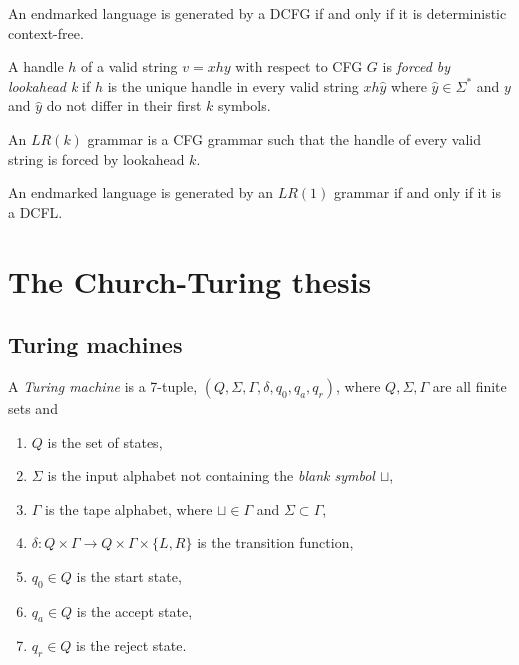 \documentclass{article}
\begin{document}
\begin{theorem}
    An endmarked language is generated by a DCFG if and only if it is deterministic context-free.
\end{theorem}

\begin{definition}
    A handle $h$ of a valid string $v=xhy$ with respect to CFG $G$ is \emph{forced by lookahead k}
    if $h$ is the unique handle in every valid string $xh\hat y$ where $\hat y\in\Sigma^*$ and
    $y$ and $\hat y$ do not differ in their first $k$ symbols.

    An $LR(k)$ grammar is a CFG grammar such that the handle of every valid string is forced by
    lookahead $k$.
\end{definition}

\begin{theorem}[Sipser p. 154]
    An endmarked language is generated by an $LR(1)$ grammar if and only if it is a DCFL.
\end{theorem}

\section{The Church-Turing thesis}

\subsection{Turing machines}

\begin{definition}
    A \emph{Turing machine} is a 7-tuple, $(Q, \Sigma, \Gamma, \delta, q_0, q_a, q_r)$,
    where $Q,\Sigma,\Gamma$ are all finite sets and 
    \begin{enumerate}
        \item $Q$ is the set of states,
        \item $\Sigma$ is the input alphabet not containing the \emph{blank symbol $\sqcup$},
        \item $\Gamma$ is the tape alphabet, where $\sqcup\in\Gamma$ and $\Sigma\subset\Gamma$,
        \item $\delta:Q\times\Gamma\to Q\times\Gamma\times\{L,R\}$ is the transition function,
        \item $q_0\in Q$ is the start state,
        \item $q_a\in Q$ is the accept state,
        \item $q_r\in Q$ is the reject state.
    \end{enumerate}
\end{definition}
\end{document}
